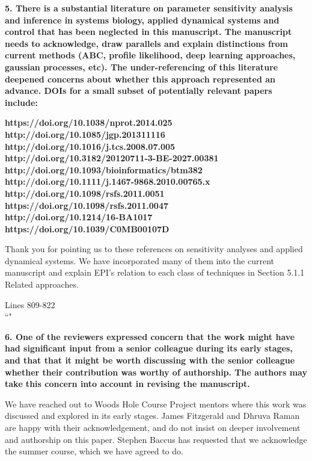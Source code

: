 \documentclass[11pt,a4paper]{article}
\begin{document}
\textbf{5. There is a substantial literature on parameter sensitivity analysis and inference in systems biology, applied dynamical systems and control that has been neglected in this manuscript. The manuscript needs to acknowledge, draw parallels and explain distinctions from current methods (ABC, profile likelihood, deep learning approaches, gaussian processes, etc). The under-referencing of this literature deepened concerns about whether this approach represented an advance. DOIs for a small subset of potentially relevant papers include:}

\textbf{https://doi.org/10.1038/nprot.2014.025 \\
http://doi.org/10.1085/jgp.201311116 \\
http://doi.org/10.1016/j.tcs.2008.07.005 \\
http://doi.org/10.3182/20120711-3-BE-2027.00381 \\
http://doi.org/10.1093/bioinformatics/btm382 \\
http://doi.org/10.1111/j.1467-9868.2010.00765.x \\
http://doi.org/10.1098/rsfs.2011.0051 \\
https://doi.org/10.1098/rsfs.2011.0047 \\
http://doi.org/10.1214/16-BA1017 \\
https://doi.org/10.1039/C0MB00107D}

Thank you for pointing us to these references on sensitivity analyses and applied dynamical systems.  
We have incorporated many of them into the current manuscript and explain EPI’s relation to each class of techniques in Section 5.1.1 Related approaches.

\begin{displayquote}
Lines 809-822 \\
``"
\end{displayquote}

\textbf{6. One of the reviewers expressed concern that the work might have had significant input from a senior colleague during its early stages, and that that it might be worth discussing with the senior colleague whether their contribution was worthy of authorship. The authors may take this concern into account in revising the manuscript.}

We have reached out to Woods Hole Course Project mentors where this work was discussed and explored in its early stages.
James Fitzgerald and Dhruva Raman are happy with their acknowledgement, and do not insist on deeper involvement and authorship on this paper.
Stephen Baccus has requested that we acknowledge the summer course, which we have agreed to do.
\end{document}
